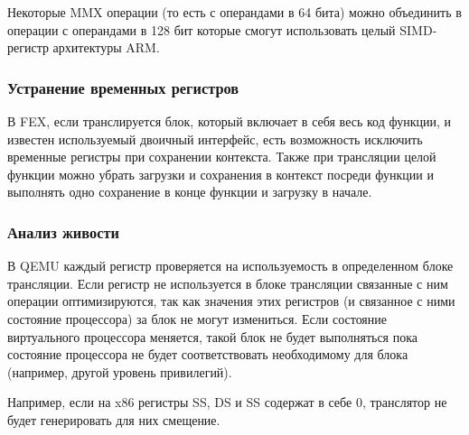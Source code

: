 Некоторые MMX операции (то есть с операндами в 64 бита) можно объединить в операции с операндами в 128 бит которые смогут использовать целый SIMD-регистр архитектуры ARM.

\subsubsection{Устранение временных регистров}

В FEX, если транслируется блок, который включает в себя весь код функции, и известен используемый двоичный интерфейс, есть возможность исключить временные регистры при сохранении контекста. Также при трансляции целой функции можно убрать загрузки и сохранения в контекст посреди функции и выполнять одно сохранение в конце функции и загрузку в начале.

\subsubsection{Анализ живости}

В QEMU каждый регистр проверяется на используемость в определенном блоке трансляции. Если регистр не используется в блоке трансляции связанные с ним операции оптимизируются, так как значения этих регистров (и связанное с ними состояние процессора) за блок не могут измениться. Если состояние виртуального процессора меняется, такой блок не будет выполняться пока состояние процессора не будет соответствовать необходимому для блока (например, другой уровень привилегий).

Например, если на x86 регистры SS, DS и SS содержат в себе 0, транслятор не будет генерировать для них смещение.

